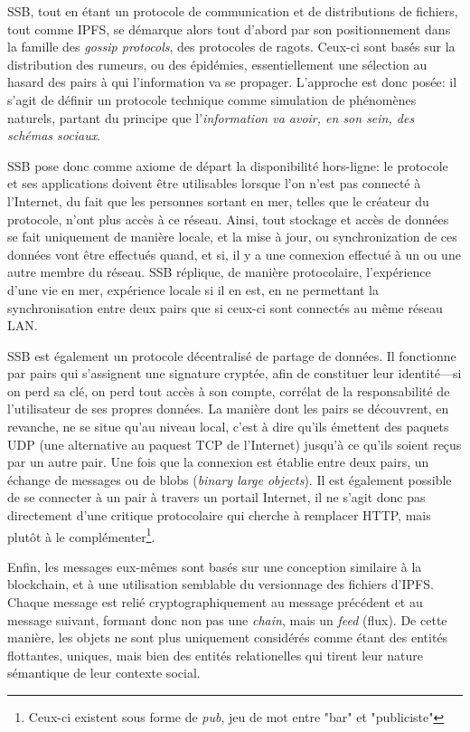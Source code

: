 \documentclass{article}
\begin{document}
SSB, tout en étant un protocole de communication et de distributions de fichiers, tout comme IPFS, se démarque alors tout d'abord par son positionnement dans la famille des \emph{gossip protocols}, des protocoles de ragots. Ceux-ci sont basés sur la distribution des rumeurs, ou des épidémies, essentiellement une sélection au hasard des pairs à qui l'information va se propager. L'approche est donc posée: il s'agit de définir un protocole technique comme simulation de phénomènes naturels, partant du principe que l'\emph{information va avoir, en son sein, des schémas sociaux}\cite{web3_foundation_secure_2019}.

SSB pose donc comme axiome de départ la disponibilité hors-ligne: le protocole et ses applications doivent être utilisables lorsque l'on n'est pas connecté à l'Internet, du fait que les personnes sortant en mer, telles que le créateur du protocole, n'ont plus accès à ce réseau. Ainsi, tout stockage et accès de données se fait uniquement de manière locale, et la mise à jour, ou synchronization de ces données vont être effectués quand, et si, il y a une connexion effectué à un ou une autre membre du réseau. SSB réplique, de manière protocolaire, l'expérience d'une vie en mer, expérience locale si il en est, en ne permettant la synchronisation entre deux pairs que si ceux-ci sont connectés au même réseau LAN.

SSB est également un protocole décentralisé de partage de données. Il fonctionne par pairs qui s'assignent une signature cryptée, afin de constituer leur identité—si on perd sa clé, on perd tout accès à son compte, corrélat de la responsabilité de l'utilisateur de ses propres données. La manière dont les pairs se découvrent, en revanche, ne se situe qu'au niveau local, c'est à dire qu'ils émettent des paquets UDP (une alternative au paquest TCP de l'Internet) jusqu'à ce qu'ils soient reçus par un autre pair. Une fois que la connexion est établie entre deux pairs, un échange de messages ou de blobs (\emph{binary large objects}). Il est également possible de se connecter à un pair à travers un portail Internet, il ne s'agit donc pas directement d'une critique protocolaire qui cherche à remplacer HTTP, mais plutôt à le complémenter\footnote{Ceux-ci existent sous forme de \emph{pub}, jeu de mot entre "bar" et "publiciste"}.

Enfin, les messages eux-mêmes sont basés sur une conception similaire à la blockchain, et à une utilisation semblable du versionnage des fichiers d'IPFS. Chaque message est relié cryptographiquement au message précédent et au message suivant, formant donc non pas une \emph{chain}, mais un \emph{feed} (flux). De cette manière, les objets ne sont plus uniquement considérés comme étant des entités flottantes, uniques, mais bien des entités relationelles qui tirent leur nature sémantique de leur contexte social.
\end{document}
